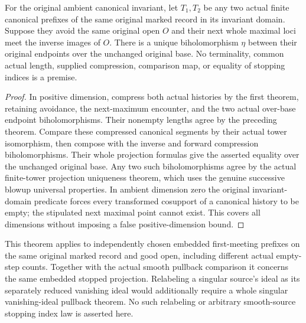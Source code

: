 \begin{theorem}
\label{hir:original-first-meeting-prefix-map-unique}
\leanok
{}
For the original ambient canonical invariant, let $T_1,T_2$ be any two
actual finite canonical prefixes of the same original marked record in
its invariant domain.  Suppose they avoid the same original open $O$ and
their next whole maximal loci meet the inverse images of $O$.  There is
a unique biholomorphism $\eta$ between their original endpoints over the
unchanged original base.  No terminality, common actual length, supplied
compression, comparison map, or equality of stopping indices is a premise.
\end{theorem}
\begin{proof}
In positive dimension, compress both actual histories by the first
theorem, retaining avoidance, the next-maximum encounter, and the two
actual over-base endpoint biholomorphisms.  Their nonempty lengths agree
by the preceding theorem.  Compare these compressed canonical segments
by their actual tower isomorphism, then compose with the inverse and
forward compression biholomorphisms.  Their whole projection formulas
give the asserted equality over the unchanged original base.  Any two
such biholomorphisms agree by the actual finite-tower projection
uniqueness theorem, which uses the genuine successive blowup universal
properties.  In ambient dimension zero the original invariant-domain
predicate forces every transformed cosupport of a canonical history to
be empty; the stipulated next maximal point cannot exist.  This covers
all dimensions without imposing a false positive-dimension bound.
\end{proof}

\begin{remark}
This theorem applies to independently chosen embedded first-meeting
prefixes on the same original marked record and good open, including
different actual empty-step counts.  Together with the actual smooth
pullback comparison it concerns the same embedded stopped projection.
Relabeling a singular source's ideal as its separately reduced vanishing
ideal would additionally require a whole singular vanishing-ideal
pullback theorem.  No such relabeling or arbitrary smooth-source stopping
index law is asserted here.
\end{remark}
